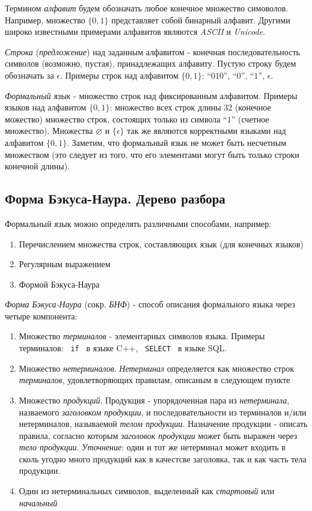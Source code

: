 Термином \textit{алфавит} будем обозначать любое конечное множество симоволов. Например, множество $\{0, 1\}$ представляет собой бинарный алфавит. Другими широко известными примерами алфавитов являются \textit{ASCII} и \textit{Unicode}. 

\textit{Строка} (\textit{предложение}) над заданным алфавитом - конечная последовательность символов (возможно, пустая), принадлежащих алфавиту. Пустую строку будем обозначать за $\epsilon$. Примеры строк над алфавитом $\{0, 1\}$: \enquote{$010$}, \enquote{$0$}, \enquote{$1$}, $\epsilon$.

\textit{Формальный язык} - множество строк над фиксированным алфавитом. Примеры языков над алфавитом $\{0, 1\}$: множество всех строк длины 32 (конечное можество) множество строк, состоящих только из символа \enquote{$1$} (счетное множество). Множества $\varnothing$ и $\{\epsilon\}$ так же являются корректными языками над алфавитом $\{0, 1\}$. Заметим, что формальный язык не может быть несчетным множеством (это следует из того, что его элементами могут быть только строки конечной длины).

\subsection{Форма Бэкуса-Наура. Дерево разбора} \label{lit:bnf}

Формальный язык можно определять различными способами, например:
\begin{enumerate}
    \item Перечислением множества строк, составляющих язык (для конечных языков)
    \item Регулярным выражением
    \item Формой Бэкуса-Наура
\end{enumerate}

\textit{Форма Бэкуса-Наура} (сокр. \textit{БНФ}) - способ описания формального языка через четыре компонента:
\begin{enumerate}
    \item Множество \textit{терминалов} - элементарных символов языка. Примеры терминалов: \texttt{ if } в языке C++, \texttt{ SELECT } в языке SQL.
    \item Множество \textit{нетерминалов}. \textit{Нетерминал} определяется как множество строк \textit{терминалов}, удовлетворяющих правилам, описаным в следующем пункте
    \item Множество \textit{продукций}. Продукция - упорядоченная пара из \textit{нетерминала}, назваемого \textit{заголовком продукции}, и последовательности из терминалов и/или нетерминалов, называемой \textit{телом продукции}. Назначение продукции - описать правила, согласно которым \textit{заголовок продукции} может быть выражен через \textit{тело продукции}. \textit{Уточнение}: один и тот же нетерминал может входить в сколь угодно много продукций как в качестсве заголовка, так и как часть тела продукции.
    \item Один из нетерминальных символов, выделенный как \textit{стартовый} или \textit{начальный}
\end{enumerate}

